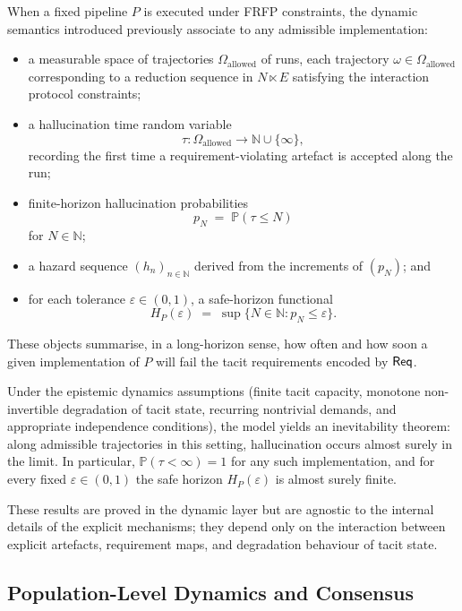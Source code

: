 When a fixed pipeline $P$ is executed under FRFP constraints, the dynamic semantics introduced previously associate to any admissible implementation:
\begin{itemize}
  \item a measurable space of trajectories $\Omega_{\mathrm{allowed}}$ of runs, each trajectory $\omega \in \Omega_{\mathrm{allowed}}$ corresponding to a reduction sequence in $N \ltimes E$ satisfying the interaction protocol constraints;
  \item a hallucination time random variable
    \[
      \tau : \Omega_{\mathrm{allowed}} \longrightarrow \mathbb{N} \cup \{\infty\},
    \]
    recording the first time a requirement-violating artefact is accepted along the run;
  \item finite-horizon hallucination probabilities
    \[
      p_N \;=\; \mathbb{P}(\tau \leq N)
    \]
    for $N \in \mathbb{N}$;
  \item a hazard sequence $(h_n)_{n \in \mathbb{N}}$ derived from the increments of $(p_N)$; and
  \item for each tolerance $\varepsilon \in (0,1)$, a safe-horizon functional
    \[
      H_P(\varepsilon) \;=\; \sup\{N \in \mathbb{N} : p_N \leq \varepsilon\}.
    \]
\end{itemize}
These objects summarise, in a long-horizon sense, how often and how soon a given implementation of $P$ will fail the tacit requirements encoded by $\mathsf{Req}$.

Under the epistemic dynamics assumptions (finite tacit capacity, monotone non-invertible degradation of tacit state, recurring nontrivial demands, and appropriate independence conditions), the model yields an inevitability theorem: along admissible trajectories in this setting, hallucination occurs almost surely in the limit. In particular, $\mathbb{P}(\tau < \infty) = 1$ for any such implementation, and for every fixed $\varepsilon \in (0,1)$ the safe horizon $H_P(\varepsilon)$ is almost surely finite.

These results are proved in the dynamic layer but are agnostic to the internal details of the explicit mechanisms; they depend only on the interaction between explicit artefacts, requirement maps, and degradation behaviour of tacit state.

\subsection{Population-Level Dynamics and Consensus}

